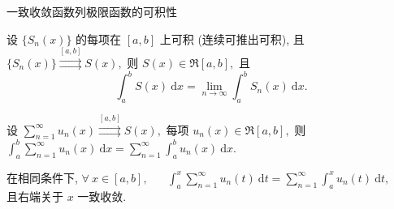\begin{frame}{一致收敛函数列极限函数的可积性}

\begin{thm}[可积性定理]
设 $\{S_n(x)\}$ 的每项在 $[a, b]$ 上可积 (连续可推出可积), 且 $\{S_n(x)\} \stackrel{[a,b]}{\rightrightarrows} S(x),$ 则 $S(x) \in \mathfrak{R}[a, b],$ 且
\[\int_a^b S(x) ~ \mathrm{d}x = \lim_{n\to\infty} \int_a^b S_n(x) ~ \mathrm{d}x.\]
\end{thm}

\pause

\begin{thm}[逐项积分定理]
设 $\sum_{n=1}^\infty u_n(x) \stackrel{[a,b]}{\rightrightarrows} S(x),$ 每项 $u_n(x) \in \mathfrak{R}[a,b],$ 则 ~~ $\int_a^b \sum_{n=1}^\infty u_n(x) ~ \mathrm{d}x = \sum_{n=1}^\infty \int_a^b u_n(x) ~ \mathrm{d}x.$
\end{thm}

\pause

\begin{cor}[变上限积分的逐项积分]
在相同条件下, $\forall~x \in [a, b],$ ~~ $\int_a^x \sum_{n=1}^\infty u_n(t) ~ \mathrm{d}t = \sum_{n=1}^\infty \int_a^x u_n(t) ~ \mathrm{d}t,$ ~~ 且右端关于 $x$ 一致收敛.
\end{cor}

\end{frame}


